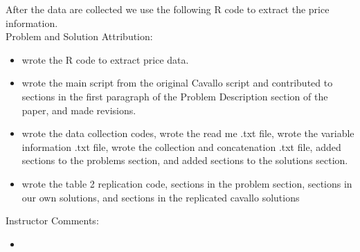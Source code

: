 After the data are collected we use the following R code to extract the price information.\\

Problem and Solution Attribution:
\begin{itemize}
\item {} wrote the R code to extract price data.
\item {} wrote the main script from the original Cavallo script and contributed to sections in the first paragraph of the Problem Description section of the paper, and made revisions.
\item {} wrote the data collection codes, wrote the read me .txt file, wrote the variable information .txt file, wrote the collection and concatenation .txt file, added sections to the problems section, and added sections to the solutions section.
\item {} wrote the table 2 replication code, sections in the problem section, sections in our own solutions, and  sections in the replicated cavallo solutions 
\end{itemize}

Instructor Comments:
\begin{itemize}
    \item {} 

\end{itemize}